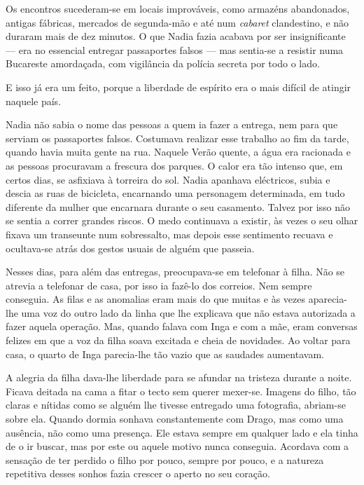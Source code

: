 Os encontros sucederam-se em locais improváveis,
como armazéns abandonados, antigas fábricas, mercados de segunda-mão e
até num \emph{cabaret} clandestino, e não duraram mais de dez minutos. O
que Nadia fazia acabava por ser insignificante --- era no essencial
entregar passaportes falsos --- mas sentia-se a resistir numa Bucareste
amordaçada, com vigilância da polícia secreta por todo o lado.

E isso já era um feito, porque a liberdade de espírito era o mais
difícil de atingir naquele país.

Nadia não sabia o nome das pessoas a quem ia fazer a entrega, nem para
que serviam os passaportes falsos. Costumava realizar esse trabalho ao
fim da tarde, quando havia muita gente na rua. Naquele Verão quente, a
água era racionada e as pessoas procuravam a frescura dos parques. O
calor era tão intenso que, em certos dias, se asfixiava à torreira do
sol. Nadia apanhava eléctricos, subia e descia as ruas de bicicleta,
encarnando uma personagem determinada, em tudo diferente da mulher que
encarnara durante o seu casamento. Talvez por isso não se sentia a
correr grandes riscos. O medo continuava a existir, às vezes o seu olhar
fixava um transeunte num sobressalto, mas depois esse sentimento recuava
e ocultava-se atrás dos gestos usuais de alguém que passeia.

Nesses dias, para além das entregas, preocupava-se em
telefonar à filha. Não se atrevia a telefonar de casa, por isso ia
fazê-lo dos correios. Nem sempre conseguia. As filas e as anomalias eram
mais do que muitas e às vezes aparecia-lhe uma voz do outro lado da
linha que lhe explicava que não estava autorizada a fazer aquela
operação. Mas, quando falava com Inga e com a mãe, eram conversas
felizes em que a voz da filha soava excitada e cheia de novidades. Ao
voltar para casa, o quarto de Inga parecia-lhe tão vazio que as saudades aumentavam.

A alegria da filha dava-lhe liberdade para se afundar na tristeza
durante a noite. Ficava deitada na cama a fitar o tecto sem querer
mexer-se. Imagens do filho, tão claras e nítidas como se alguém lhe
tivesse entregado uma fotografia, abriam-se sobre ela. Quando dormia sonhava constantemente com
Drago, mas como uma ausência, não como uma presença. Ele estava sempre
em qualquer lado e ela tinha de o ir buscar, mas por este ou aquele
motivo nunca conseguia. Acordava com a sensação de ter perdido o filho
por pouco, sempre por pouco, e a natureza repetitiva desses sonhos
fazia crescer o aperto no seu coração.

